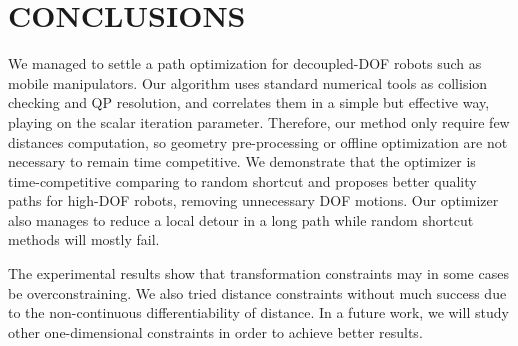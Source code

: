 \documentclass{tADR2e}
\begin{document}
\section{CONCLUSIONS}
We managed to settle a path optimization for decoupled-DOF robots such as mobile 
manipulators. Our algorithm uses standard numerical tools as collision checking 
and QP resolution, and correlates them in a 
simple but effective way, playing on the scalar iteration parameter. Therefore, 
our method only require few distances computation, so geometry pre-processing or 
offline optimization are not necessary to remain time competitive. We demonstrate 
that the optimizer is 
time-competitive comparing to random shortcut and proposes better quality paths 
for high-DOF robots, removing unnecessary DOF motions. Our optimizer also manages 
to reduce a local detour in a long path while random shortcut methods will mostly 
fail.

The experimental results show that transformation constraints may in some cases be overconstraining. We also tried distance constraints without much success due to the non-continuous differentiability of distance. In a future work, we will study other one-dimensional constraints in order to achieve better results.


\end{document}

